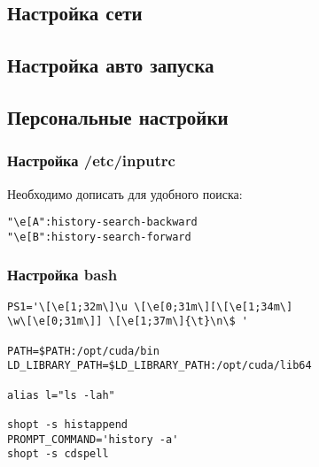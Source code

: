 \documentclass[12pt, a4paper]{article}
\begin{document}
\subsection{Настройка сети}

\subsection{Настройка авто запуска}


\subsection{Персональные настройки}

\subsubsection{Настройка /etc/inputrc}

Необходимо дописать для удобного поиска:

\begin{verbatim}
"\e[A":history-search-backward
"\e[B":history-search-forward
\end{verbatim}


\subsubsection{Настройка bash}
\begin{verbatim}
PS1='\[\e[1;32m\]\u \[\e[0;31m\][\[\e[1;34m\]
\w\[\e[0;31m\]] \[\e[1;37m\]{\t}\n\$ '

PATH=$PATH:/opt/cuda/bin
LD_LIBRARY_PATH=$LD_LIBRARY_PATH:/opt/cuda/lib64

alias l="ls -lah"

shopt -s histappend
PROMPT_COMMAND='history -a'
shopt -s cdspell
\end{verbatim}
\end{document}
